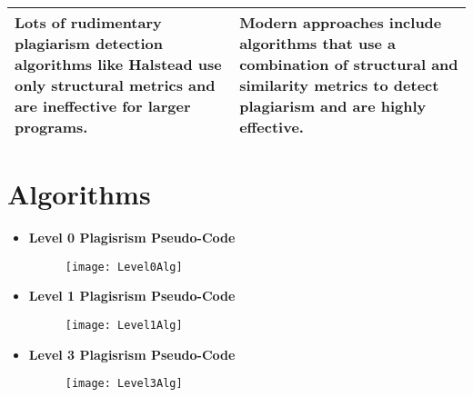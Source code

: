 \begin{table}[h!]
\begin{tabular}{|p{6cm}|p{6cm}|}
			
			Lots of rudimentary plagiarism detection algorithms like Halstead use only structural metrics and are ineffective for larger programs. &  Modern approaches include algorithms that use a combination of structural and similarity metrics to detect plagiarism and are highly effective. \\ \hline 
			
			\end{tabular}
					
			
			
			\end{table}  
			
			
			
			

			
			\section{Algorithms}
			
			\begin{itemize}
			
			\item \textbf{Level 0 Plagisrism Pseudo-Code}
				\begin{figure}[h]
				\texttt{[image: Level0Alg]}
  				\label{fig:Level0}
  				\end{figure}
  				
			
			\item \textbf{Level 1 Plagisrism Pseudo-Code}
				\begin{figure}[h]				
				\texttt{[image: Level1Alg]}
  				\label{fig:Level1}
				\end{figure}
				
			\pagebreak				

			\item \textbf{Level 3 Plagisrism Pseudo-Code}\\
				\begin{figure}[h]				
				\texttt{[image: Level3Alg]}
  				\label{fig:Level3}	
  				\end{figure}		
			
			\end{itemize} 
			
			
			
			
			
			
			
			
			
			
			
			
			
			
			
			
			
			
			